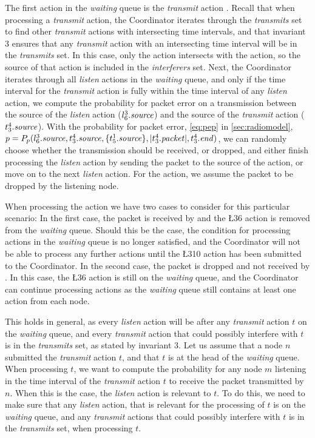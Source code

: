 The first action in the \textit{waiting} queue is the \textit{transmit} action . Recall that when
processing a \textit{transmit} action, the Coordinator iterates through the \textit{transmits} set to find
other \textit{transmit} actions with intersecting time intervals, and that invariant 3 ensures that any
\textit{transmit} action with an intersecting time interval will be in the \textit{transmits} set. In this
case, only the  action intersects with the  action, so the source of that action is included
in the \textit{interferers} set. Next, the Coordinator iterates through all \textit{listen} actions in the
\textit{waiting} queue, and only if the time interval for the \textit{transmit} action is fully within the
time interval of any \textit{listen} action, we compute the probability for packet error on a transmission
between the source of the \textit{listen} action ($l^{3}_{6}.\mathit{source}$) and the source of the
\textit{transmit} action ($t^{4}_{3}.\mathit{source}$). With the probability for packet error, \autoref{eq:pep}
in \autoref{sec:radiomodel}, $p = P_p(l^{3}_{6}.\mathit{source}, t^{4}_{3}.\mathit{source},
\{t^{1}_{5}.\mathit{source} \}, |t^{4}_{3}.\mathit{packet}|, t^{4}_{3}.\mathit{end})$, we can randomly choose
whether the transmission should be received, or dropped, and either finish processing the \textit{listen}
action by sending the packet to the source of the action, or move on to the next \textit{listen} action. For
the  action, we assume the packet to be dropped by the listening node. \smallbreak

When processing the  action we have two cases to consider for this particular scenario: In the first
case, the packet is received by  and the \L{3}{6} action is removed from the \textit{waiting} queue.
Should this be the case, the condition for processing actions in the \textit{waiting} queue is no longer
satisfied, and the Coordinator will not be able to process any further actions until the \L{3}{10} action has
been submitted to the Coordinator. In the second case, the packet is dropped and not received by . In
this case, the \L{3}{6} action is still on the \textit{waiting} queue, and the Coordinator can continue
processing actions as the \textit{waiting} queue still contains at least one action from each node.
\medbreak

This holds in general, as every \textit{listen} action will be after any \textit{transmit} action $t$ on the
\textit{waiting} queue, and every \textit{transmit} action that could possibly interfere with $t$ is in the
\textit{transmits} set, as stated by invariant 3. Let us assume that a node $n$ submitted the
\textit{transmit} action $t$, and that $t$ is at the head of the \textit{waiting} queue. When processing $t$,
we want to compute the probability for any node $m$ listening in the time interval of the \textit{transmit}
action $t$ to receive the packet transmitted by $n$. When this is the case, the \textit{listen} action is
relevant to $t$. To do this, we need to make sure that any \textit{listen} action, that is relevant for the
processing of $t$ is on the \textit{waiting} queue, and any \textit{transmit} actions that could possibly
interfere with $t$ is in the \textit{transmits} set, when processing $t$. \smallbreak


